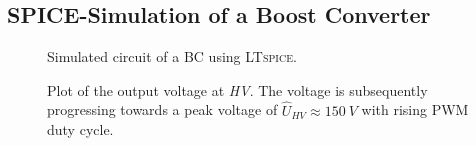     \subsection{SPICE-Simulation of a Boost Converter}\label{sec:A2_spice_boost}
        \begin{figure}[H]
            \centering
            
            \caption[Simulated circuit of a BC.]{Simulated circuit of a BC using \textsc{LTspice}.}
            \label{fig:simCircuit}
        \end{figure}
        \begin{figure}[H]
            \centering
            
            \caption[Simulated output voltages at various duty cycles]{Plot of the output voltage at \textit{HV}. The voltage is subsequently progressing towards a peak voltage of \( \hat{U}_{HV} \approx \SI{150}{V} \) with rising PWM duty cycle.}
            \label{fig:plotSimCircuit}
        \end{figure}
